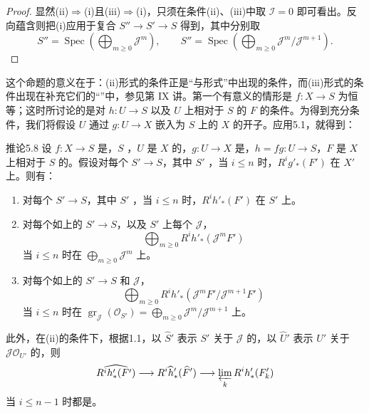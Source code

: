 \begin{proof}
显然(ii)$\Rightarrow$(i)且(iii)$\Rightarrow$(i)，只须在条件(ii)、(iii)中取 $\mathcal I=0$ 即可看出。反向蕴含则把(i)应用于复合 $S''\to S'\to S$ 得到，其中分别取
\[
 S''=\operatorname{Spec}\left(\bigoplus_{m\geq0}\mathcal J^m\right),\qquad
 S''=\operatorname{Spec}\left(\bigoplus_{m\geq0}\mathcal J^m/\mathcal J^{m+1}\right).
\]
\end{proof}
这个命题的意义在于：(ii)形式的条件正是“与形式”中出现的条件，而(iii)形式的条件出现在补充它们的“”中，参见第 IX 讲。第一个有意义的情形是 $f:X\to S$ 为恒等；这时所讨论的是对 $h:U\to S$ 以及 $U$ 上相对于 $S$ 的 $F$ 的条件。为得到充分条件，我们将假设 $U$ 通过 $g:U\to X$ 嵌入为 $S$ 上的 $X$ 的开子。应用5.1，就得到：
\begin{SGAresult}{推论}{5.8}
设 $f:X\to S$ 是，$S$ ，$U$ 是 $X$ 的，$g:U\to X$ 是，$h=fg:U\to S$，$F$ 是 $X$ 上相对于 $S$ 的。假设对每个 $S'\to S$，其中 $S'$ ，当 $i\leq n$ 时，$R^ig'_*(F')$ 在 $X'$ 上。则有：
\begin{enumerate}
\item[(i)] 对每个 $S'\to S$，其中 $S'$ ，当 $i\leq n$ 时，$R^ih'_*(F')$ 在 $S'$ 上。
\item[(ii)] 对每个如上的 $S'\to S$，以及 $S'$ 上每个 $\mathcal J$，
\[
 \bigoplus_{m\geq0}R^ih'_*(\mathcal J^mF')
\]
当 $i\leq n$ 时在 $\bigoplus_{m\geq0}\mathcal J^m$ 上。
\item[(iii)] 对每个如上的 $S'\to S$ 和 $\mathcal J$，
\[
 \bigoplus_{m\geq0}R^ih'_*(\mathcal J^mF'/\mathcal J^{m+1}F')
\]
当 $i\leq n$ 时在 $\operatorname{gr}_{\mathcal J}(\mathcal O_{S'})=\bigoplus_{m\geq0}\mathcal J^m/\mathcal J^{m+1}$ 上。
\end{enumerate}
此外，在(ii)的条件下，根据1.1，以 $\widehat S'$ 表示 $S'$ 关于 $\mathcal J$ 的，以 $\widehat U'$ 表示 $U'$ 关于 $\mathcal J\mathcal O_{U'}$ 的，则
\[
 \widehat{R^ih'_*(F')}\longrightarrow R^i\widehat h'_* (\widehat F')
 \longrightarrow\varprojlim_k R^ih'_*(F'_k)
\]
当 $i\leq n-1$ 时都是。
\end{SGAresult}
